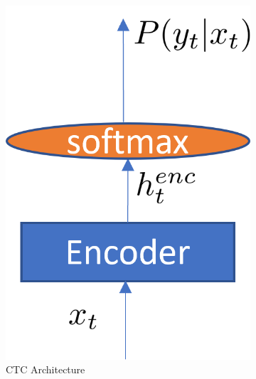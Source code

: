 \begin{figure}[h!]
    \centering
    \begin{subfigure}[b]{0.22\textwidth}
        \centering
        \includegraphics[width=\linewidth]{obrazky-figures/archs/CTC.png}
        \caption{CTC Architecture}
        \label{fig:ctc_arch}
    \end{subfigure}
    \hfill
    \begin{subfigure}[b]{0.32\textwidth} 
        \centering

\end{subfigure}
\end{figure}
